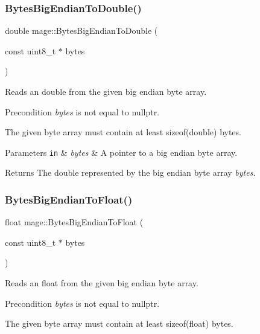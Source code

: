 \subsubsection{\texorpdfstring{Bytes\+Big\+Endian\+To\+Double()}{BytesBigEndianToDouble()}}
{\footnotesize\ttfamily double mage\+::\+Bytes\+Big\+Endian\+To\+Double (\begin{DoxyParamCaption}\item[{const uint8\+\_\+t $\ast$}]{bytes }\end{DoxyParamCaption})\hspace{0.3cm}{\ttfamily [noexcept]}}

Reads an double from the given big endian byte array.

\begin{DoxyPrecond}{Precondition}
{\itshape bytes} is not equal to {\ttfamily nullptr}. 

The given byte array must contain at least {\ttfamily sizeof(double)} bytes. 
\end{DoxyPrecond}

\begin{DoxyParams}[1]{Parameters}
\mbox{\tt in}  & {\em bytes} & A pointer to a big endian byte array. \\
\hline
\end{DoxyParams}
\begin{DoxyReturn}{Returns}
The {\ttfamily double} represented by the big endian byte array {\itshape bytes}. 
\end{DoxyReturn}
\hypertarget{namespacemage_acd50317aa85d2ceca5556f79219e7f4f}{}\label{namespacemage_acd50317aa85d2ceca5556f79219e7f4f} 
\subsubsection{\texorpdfstring{Bytes\+Big\+Endian\+To\+Float()}{BytesBigEndianToFloat()}}
{\footnotesize\ttfamily float mage\+::\+Bytes\+Big\+Endian\+To\+Float (\begin{DoxyParamCaption}\item[{const uint8\+\_\+t $\ast$}]{bytes }\end{DoxyParamCaption})\hspace{0.3cm}{\ttfamily [noexcept]}}

Reads an float from the given big endian byte array.

\begin{DoxyPrecond}{Precondition}
{\itshape bytes} is not equal to {\ttfamily nullptr}. 

The given byte array must contain at least {\ttfamily sizeof(float)} bytes. 
\end{DoxyPrecond}

